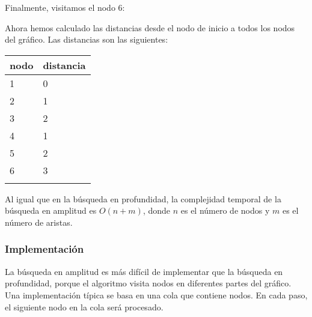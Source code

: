 Finalmente, visitamos el nodo 6:
\begin{center}
\end{center}
Ahora hemos calculado las distancias
desde el nodo de inicio a todos los nodos del gráfico.
Las distancias son las siguientes:

\begin{tabular}{ll}
\\
nodo & distancia \\
\hline
1 & 0 \\
2 & 1 \\
3 & 2 \\
4 & 1 \\
5 & 2 \\
6 & 3 \\
\\
\end{tabular}

Al igual que en la búsqueda en profundidad,
la complejidad temporal de la búsqueda en amplitud
es $O(n+m)$, donde $n$ es el número de nodos
y $m$ es el número de aristas.

\subsubsection*{Implementación}

La búsqueda en amplitud es más difícil
de implementar que la búsqueda en profundidad,
porque el algoritmo visita nodos
en diferentes partes del gráfico.
Una implementación típica se basa en
una cola que contiene nodos.
En cada paso, el siguiente nodo en la cola
será procesado.

